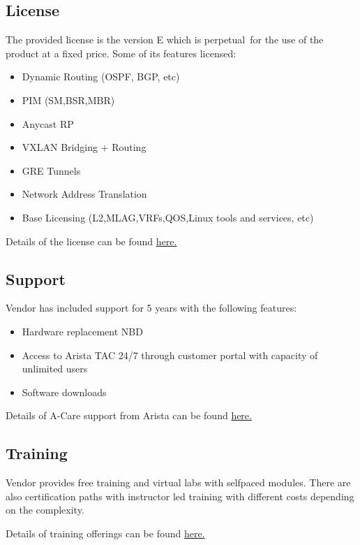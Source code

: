 \subsection{License}

The provided license is the version E which is perpetual for the use of the product at a fixed price. Some of its features licensed:

\begin{itemize}
  \item Dynamic Routing (OSPF, BGP, etc)
  \item PIM (SM,BSR,MBR)
  \item Anycast RP
  \item VXLAN Bridging + Routing
  \item GRE Tunnels
  \item Network Address Translation
  \item Base Licensing (L2,MLAG,VRFs,QOS,Linux tools and services, etc)
\end{itemize}

Details of the license can be found \href{https://www.arista.com/en/support/product-documentation/eos-feature-licensing}{here.}

\subsection{Support}

Vendor has included support for 5 years with the following features:
\begin{itemize}
  \item Hardware replacement NBD
  \item Access to Arista TAC 24/7 through customer portal with capacity of unlimited users
  \item Software downloads
\end{itemize}

Details of A-Care support from Arista can be found \href{https://www.arista.com/assets/data/pdf/A-CareServicesOverview.pdf}{here.}

\subsection{Training}

Vendor provides free training and virtual labs with selfpaced modules. There are also certification paths with instructor led training with different costs depending on the complexity.

Details of training offerings can be found \href{https://www.arista.com/en/support/hands-on-training}{here.}

